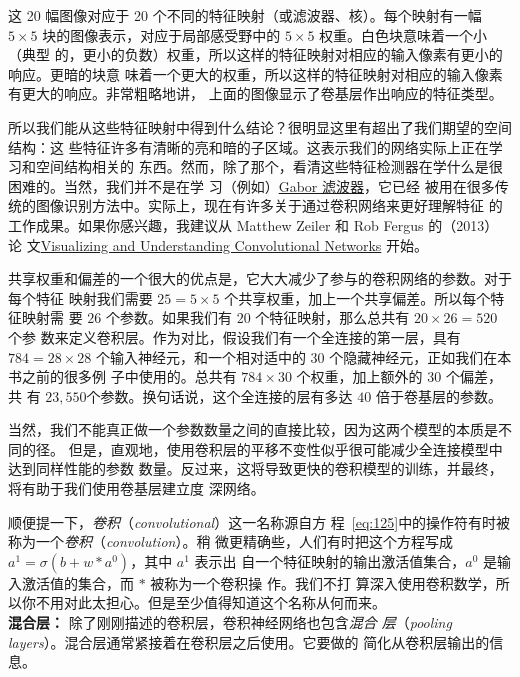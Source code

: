 这 20 幅图像对应于 20 个不同的特征映射（或滤波器、核）。每个映射有一幅 $5 \times
5$ 块的图像表示，对应于局部感受野中的 $5 \times 5$ 权重。白色块意味着一个小（典型
的，更小的负数）权重，所以这样的特征映射对相应的输入像素有更小的响应。更暗的块意
味着一个更大的权重，所以这样的特征映射对相应的输入像素有更大的响应。非常粗略地讲，
上面的图像显示了卷基层作出响应的特征类型。

所以我们能从这些特征映射中得到什么结论？很明显这里有超出了我们期望的空间结构：这
些特征许多有清晰的亮和暗的子区域。这表示我们的网络实际上正在学习和空间结构相关的
东西。然而，除了那个，看清这些特征检测器在学什么是很困难的。当然，我们并不是在学
习（例如）\href{http://en.wikipedia.org/wiki/Gabor_filter}{Gabor 滤波器}，它已经
被用在很多传统的图像识别方法中。实际上，现在有许多关于通过卷积网络来更好理解特征
的工作成果。如果你感兴趣，我建议从 Matthew Zeiler 和 Rob Fergus 的（2013）论
文\href{http://arxiv.org/abs/1311.2901}{Visualizing and Understanding
  Convolutional Networks} 开始。

共享权重和偏差的一个很大的优点是，它大大减少了参与的卷积网络的参数。对于每个特征
映射我们需要 $25 = 5 \times 5$ 个共享权重，加上一个共享偏差。所以每个特征映射需
要 $26$ 个参数。如果我们有 $20$ 个特征映射，那么总共有 $20 \times 26 = 520$ 个参
数来定义卷积层。作为对比，假设我们有一个全连接的第一层，具有 $784 = 28 \times
28$ 个输入神经元，和一个相对适中的 $30$ 个隐藏神经元，正如我们在本书之前的很多例
子中使用的。总共有 $784 \times 30$ 个权重，加上额外的 $30$ 个偏差，共
有 $23,550$个参数。换句话说，这个全连接的层有多达 $40$ 倍于卷基层的参数。

当然，我们不能真正做一个参数数量之间的直接比较，因为这两个模型的本质是不同的径。
但是，直观地，使用卷积层的平移不变性似乎很可能减少全连接模型中达到同样性能的参数
数量。反过来，这将导致更快的卷积模型的训练，并最终，将有助于我们使用卷基层建立度
深网络。

顺便提一下，\emph{卷积}（\textit{convolutional}）这一名称源自方
程~\eqref{eq:125}中的操作符有时被称为一个\emph{卷积}（\textit{convolution}）。稍
微更精确些，人们有时把这个方程写成 $a^1 = \sigma(b + w * a^0)$，其中 $a^1$ 表示出
自一个特征映射的输出激活值集合，$a^0$ 是输入激活值的集合，而 $*$ 被称为一个卷积操
作。我们不打
算深入使用卷积数学，所以你不用对此太担心。但是至少值得知道这个名称从何而来。\\

\textbf{混合层：} 除了刚刚描述的卷积层，卷积神经网络也包含\emph{混合
  层}（\textit{pooling layers}）。混合层通常紧接着在卷积层之后使用。它要做的
简化从卷积层输出的信息。

